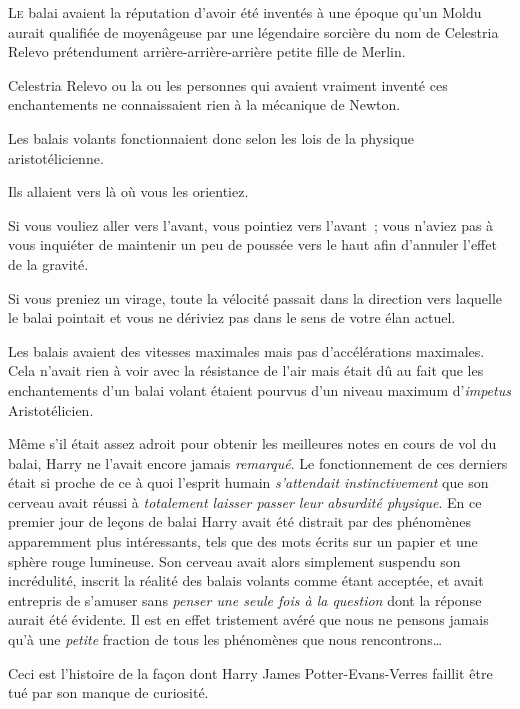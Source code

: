 
\lettrine{L}{e} balai avaient la réputation d'avoir été inventés à une époque qu'un Moldu aurait qualifiée de moyenâgeuse par une légendaire sorcière du nom de Celestria Relevo prétendument arrière-arrière-arrière petite fille de Merlin.

Celestria Relevo ou la ou les personnes qui avaient vraiment inventé ces enchantements ne connaissaient rien à la mécanique de Newton.

Les balais volants fonctionnaient donc selon les lois de la physique aristotélicienne.

Ils allaient vers là où vous les orientiez.

Si vous vouliez aller vers l'avant, vous pointiez vers l'avant~; vous n'aviez pas à vous inquiéter de maintenir un peu de poussée vers le haut afin d'annuler l'effet de la gravité.

Si vous preniez un virage, toute la vélocité passait dans la direction vers laquelle le balai pointait et vous ne dériviez pas dans le sens de votre élan actuel.

Les balais avaient des vitesses maximales mais pas d'accélérations maximales.
Cela n'avait rien à voir avec la résistance de l'air mais était dû au fait que les enchantements d'un balai volant étaient pourvus d'un niveau maximum d'\emph{impetus} Aristotélicien.

Même s'il était assez adroit pour obtenir les meilleures notes en cours de vol du balai, Harry ne l'avait encore jamais \emph{remarqué}.
Le fonctionnement de ces derniers était si proche de ce à quoi l'esprit humain \emph{s'attendait instinctivement} que son cerveau avait réussi à \emph{totalement laisser passer leur absurdité physique}.
En ce premier jour de leçons de balai Harry avait été distrait par des phénomènes apparemment plus intéressants, tels que des mots écrits sur un papier et une sphère rouge lumineuse.
Son cerveau avait alors simplement suspendu son incrédulité, inscrit la réalité des balais volants comme étant acceptée, et avait entrepris de s'amuser sans \emph{penser une seule fois à la question} dont la réponse aurait été évidente.
Il est en effet tristement avéré que nous ne pensons jamais qu'à une \emph{petite} fraction de tous les phénomènes que nous rencontrons…

Ceci est l'histoire de la façon dont Harry James Potter-Evans-Verres faillit être tué par son manque de curiosité.

